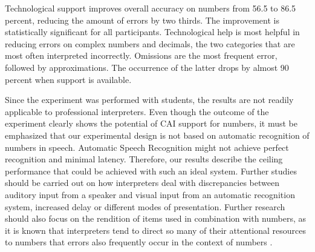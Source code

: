 \documentclass[output=paper]{langsci/langscibook}
\begin{document}
Technological support improves overall accuracy on numbers from 56.5 to 86.5 percent, reducing the amount of errors by two thirds. The improvement is statistically significant for all participants. Technological help is most helpful in reducing errors on complex numbers and decimals, the two categories that are most often interpreted incorrectly. Omissions are the most frequent error, followed by approximations. The occurrence of the latter drops by almost 90 percent when support is available.

Since the experiment was performed with students, the results are not readily applicable to professional interpreters. Even though the outcome of the experiment clearly shows the potential of CAI support for numbers, it must be emphasized that our experimental design is not based on automatic recognition of numbers in speech. Automatic Speech Recognition might not achieve perfect recognition and minimal latency. Therefore, our results describe the ceiling performance that could be achieved with such an ideal system. Further studies should be carried out on how interpreters deal with discrepancies between auditory input from a speaker and visual input from an automatic recognition system, increased delay or different modes of presentation. Further research should also focus on the rendition of items used in combination with numbers, as it is known that interpreters tend to direct so many of their attentional resources to numbers that errors also frequently occur in the context of numbers \citep{Gile2009}.

\sloppy
\printbibliography[heading=subbibliography,notkeyword=this]
\end{document}
